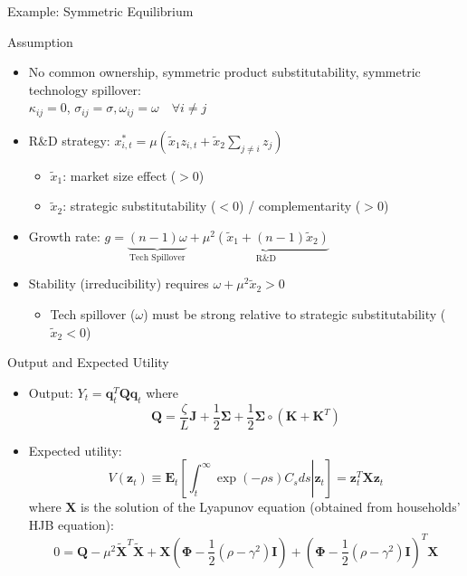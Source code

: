 \documentclass[
  10pt,
  aspectratio=169,   %
]{beamer}
\theoremstyle{plain}
\begin{document}
\begin{frame}{Example: Symmetric Equilibrium}
  \begin{block}{Assumption}
    \label{symmetric}
    \begin{itemize}
      \item No common ownership, symmetric product substitutability, symmetric technology spillover:\\ $\kappa_{ij} = 0$, $\sigma_{ij} = \sigma, \omega_{ij} = \omega \quad  \forall i \neq j$
    \end{itemize}
  \end{block}
  \begin{itemize}
    \item R\&D strategy:
          $
            x_{i,t}^* = \mu \left( \tilde{x}_1 z_{i,t} + \tilde{x}_2 \sum_{j \neq i} z_j \right)
          $
          \begin{itemize}
            \item $\tilde{x}_1$: market size effect ($>0$)
            \item $\tilde{x}_2$: strategic substitutability ($<0$) / complementarity ($>0$)
          \end{itemize} \medskip{}
    \item Growth rate:
          $g =  \underbrace{(n-1)\omega}_{\text{Tech Spillover}} + \underbrace{\mu^2\left(\tilde{x}_1 + (n-1)\tilde{x}_2\right)}_{\text{R\&D}}$ \medskip{}
    \item Stability (irreducibility) requires
          $\omega + \mu^2 \tilde{x}_2 > 0$
          \begin{itemize}
            \item Tech spillover ($\omega$) must be strong relative to strategic substitutability ($\tilde{x}_2<0$)
          \end{itemize}
  \end{itemize}
  \hyperlink{bgp}{}
\end{frame}

\begin{frame}{Output and Expected Utility}
  \label{X}
  \begin{itemize}
    \item Output: $Y_{t}=\bm{q}_{t}^{T}\bm{Q}\bm{q}_{t}$ where
          \[
            \bm{Q}=\frac{\zeta}{L}\bm{J}+\frac{1}{2}\bm{\Sigma}+\frac{1}{2}\bm{\Sigma}\circ\left(\bm{K}+\bm{K}^{T}\right)
          \]
    \item Expected utility:
          \[
            V\left(\bm{z}_{t}\right)\equiv\bm{E}_{t}\left[\left.\int_{t}^{\infty}\exp\left(-\rho s\right)C_{s}ds\right|\bm{z}_{t}\right]=\bm{z}_{t}^{T}\bm{X}\bm{z}_{t}
          \]
          where $\bm{X}$ is the solution of the Lyapunov equation (obtained from households' HJB equation):
          \[
            0=\bm{Q}-\mu^{2}\tilde{\bm{X}}^{T}\tilde{\bm{X}}+\bm{X}\left(\bm{\Phi}-\frac{1}{2}\left(\rho-\gamma^{2}\right)\bm{I}\right)+\left(\bm{\Phi}-\frac{1}{2}\left(\rho-\gamma^{2}\right)\bm{I}\right)^{T}\bm{X}
          \]
  \end{itemize}
  \hyperlink{aggregation}{}
\end{frame}
\end{document}
